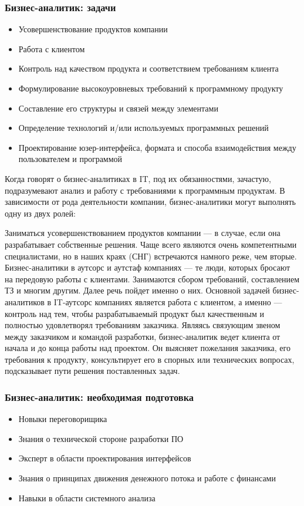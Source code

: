 \documentclass{../industrial-development}
\begin{document}
\begin{frame} \frametitle{Бизнес-аналитик: задачи}
  \begin{itemize}
	\item Усовершенствование продуктов компании
	\item Работа с клиентом
	\item Контроль над качеством продукта и соответствием требованиям клиента
	\item Формулирование высокоуровневых требований к программному продукту
  \item Составление его структуры и связей между элементами
\item Определение технологий и/или используемых программных решений
\item Проектирование юзер-интерфейса, формата и способа взаимодействия между пользователем и программой
	\end{itemize}
\end{frame}

\lecturenotes
Когда говорят о бизнес-аналитиках в IT, под их обязанностями, зачастую, подразумевают анализ и работу с требованиями к программным продуктам. В зависимости от рода деятельности компании, бизнес-аналитики могут выполнять одну из двух ролей:

Заниматься усовершенствованием продуктов компании — в случае, если она разрабатывает собственные решения. Чаще всего являются очень компетентными специалистами, но в наших краях (СНГ) встречаются намного реже, чем вторые.
Бизнес-аналитики в аутсорс и аутстаф компаниях — те люди, которых бросают на передовую работы с клиентами. Занимаются сбором требований, составлением ТЗ и многим другим. Далее речь пойдет именно о них.
Основной задачей бизнес-аналитиков в IT-аутсорс компаниях является работа с клиентом, а именно — контроль над тем, чтобы разрабатываемый продукт был качественным и полностью удовлетворял требованиям заказчика.
Являясь связующим звеном между заказчиком и командой разработки, бизнес-аналитик ведет клиента от начала и до конца работы над проектом. Он выясняет пожелания заказчика, его требования к продукту, консультирует его в спорных или технических вопросах, подсказывает пути решения поставленных задач.~\cite{Business}
 

\begin{frame} \frametitle{Бизнес-аналитик: необходимая подготовка}
  \begin{itemize}
	\item Новыки переговорищика
	\item Знания о технической стороне разработки ПО
	\item Эксперт в области проектирования интерфейсов 
	\item Знания о принципах движения денежного потока и работе с финансами 
	\item Навыки в области системного анализа
	\end{itemize}
\end{frame}
\end{document}
